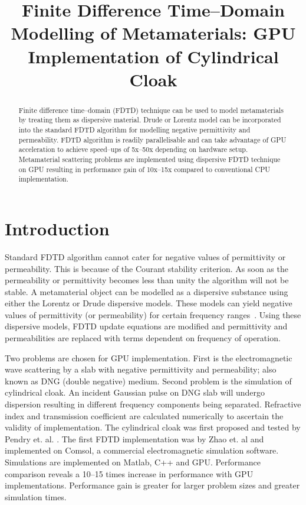 \documentclass{article}
\title{Finite Difference Time--Domain Modelling of Metamaterials: GPU Implementation of Cylindrical Cloak} %
\begin{document}
\maketitle

%
\begin{abstract}
Finite difference time--domain (FDTD) technique can be used to model metamaterials by treating them as dispersive material. Drude or Lorentz model can be incorporated into the standard FDTD algorithm for modelling negative permittivity and permeability. FDTD algorithm is readily parallelisable and can take advantage of GPU acceleration to achieve speed--ups of 5x--50x depending on hardware setup. Metamaterial scattering problems are implemented using dispersive FDTD technique on GPU resulting in performance gain of 10x--15x compared to conventional CPU implementation.
\end{abstract}

%
\section{Introduction}

Standard FDTD algorithm cannot cater for negative values of permittivity or permeability. This is because of the Courant stability criterion. As soon as the permeability or permittivity becomes less than unity the algorithm will not be stable. A metamaterial object can be modelled as a dispersive substance using either the Lorentz or Drude dispersive models. These models can yield negative values of permittivity (or permeability) for certain frequency ranges~\cite{NumericalFDTD-Sibel}. Using these dispersive models, FDTD update equations are modified and permittivity and permeabilities are replaced with terms dependent on frequency of operation.

Two problems are chosen for GPU implementation. First is the electromagnetic wave scattering by a slab with negative permittivity and permeability; also known as DNG (double negative) medium. Second problem is the simulation of cylindrical cloak. An incident Gaussian pulse on DNG slab will undergo dispersion resulting in different frequency components being separated. Refractive index and transmission coefficient are calculated numerically to ascertain the validity of implementation. The cylindrical cloak was first proposed and tested by Pendry et. al. \cite{PendryShurig-MicrowaveCloak}. The first FDTD implementation was by Zhao et. al \cite{Radial-Zhao} and implemented on Comsol, a commercial electromagnetic simulation software. Simulations are implemented on Matlab, C++ and GPU. Performance comparison reveals a 10--15 times increase in performance with GPU implementations. Performance gain is greater for larger problem sizes and greater simulation times.
\end{document}
